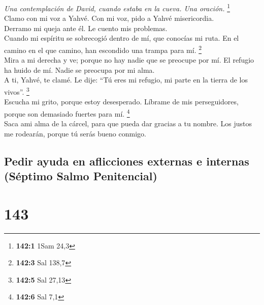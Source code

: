 \emph{Una contemplación de David, cuando estaba en la cueva. Una
oración.} \footnote{\textbf{142:1} 1Sam 24,3}\\
 Clamo con mi voz a Yahvé. Con mi voz, pido a Yahvé
misericordia.\\
 Derramo mi queja ante él. Le cuento mis problemas.\\
 Cuando mi espíritu se sobrecogió dentro de mí, que
conocías mi ruta. En el camino en el que camino, han escondido una
trampa para mí. \footnote{\textbf{142:3} Sal 138,7}\\
 Mira a mi derecha y ve; porque no hay nadie que se
preocupe por mí. El refugio ha huido de mí. Nadie se preocupa por mi
alma.\\
 A ti, Yahvé, te clamé. Le dije: ``Tú eres mi refugio, mi
parte en la tierra de los vivos''. \footnote{\textbf{142:5} Sal 27,13}\\
 Escucha mi grito, porque estoy desesperado. Líbrame de
mis perseguidores, porque son demasiado fuertes para mí. \footnote{\textbf{142:6}
  Sal 7,1}\\
 Saca ami alma de la cárcel, para que pueda dar gracias a
tu nombre. Los justos me rodearán, porque tú serás bueno conmigo.

\hypertarget{pedir-ayuda-en-aflicciones-externas-e-internas-suxe9ptimo-salmo-penitencial}{%
\subsection{Pedir ayuda en aflicciones externas e internas (Séptimo
Salmo
Penitencial)}\label{pedir-ayuda-en-aflicciones-externas-e-internas-suxe9ptimo-salmo-penitencial}}

\hypertarget{section-140}{%
\section{143}\label{section-140}}

